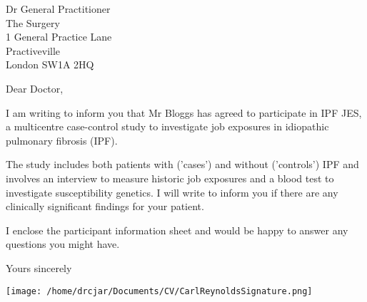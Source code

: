 \documentclass[ipfjes,letterpaper,pagesize,UScommercial9]{scrlttr2}
\begin{document}
\begin{letter}{Dr General Practitioner \\ The Surgery \\ 1 General Practice Lane \\ Practiveville \\ London SW1A 2HQ}


\opening{Dear Doctor,}

    I am writing to inform you that Mr Bloggs has agreed to participate in IPF JES, a multicentre case-control study to investigate job exposures in idiopathic pulmonary fibrosis (IPF).
    
    The study includes both patients with ('cases') and without ('controls') IPF and involves an interview to measure historic job exposures and a blood test to investigate susceptibility genetics. I will write to inform you if there are any clinically significant findings for your patient. 
    
    I enclose the participant information sheet and would be happy to answer any questions you might have.




\closing{Yours sincerely}

    \texttt{[image: /home/drcjar/Documents/CV/CarlReynoldsSignature.png]}

\end{letter}
\end{document}
